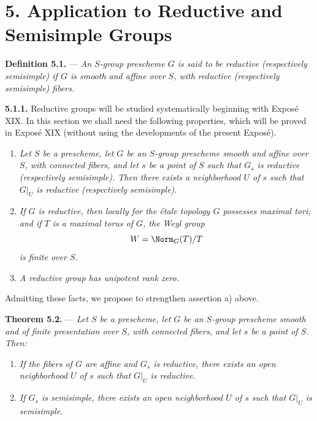 
%
\section*{5. Application to Reductive and Semisimple Groups}

\noindent{}%
\textbf{Definition 5.1.} --- \textit{An \(S\)-group prescheme
\(G\) is said to be \emph{reductive} (respectively
\emph{semisimple}) if \(G\) is smooth and affine over \(S\), with
reductive (respectively semisimple) fibers.}

\medskip
\noindent{}%
\textbf{5.1.1.}
Reductive groups will be studied systematically beginning with
Exposé XIX. In this section we shall need the following
properties, which will be proved in Exposé XIX (without using the
developments of the present Exposé).

\begin{enumerate}
\renewcommand{\labelenumi}{\textit{\alph{enumi})}}
\item \textit{Let \(S\) be a prescheme, let \(G\) be an
\(S\)-group prescheme smooth and affine over \(S\), with connected
fibers, and let \(s\) be a point of \(S\) such that \(G_s\) is
reductive (respectively semisimple). Then there exists a
neighborhood \(U\) of \(s\) such that \(G|_U\) is reductive
(respectively semisimple).}

\item \textit{If \(G\) is reductive, then locally for the étale
topology \(G\) possesses maximal tori; and if \(T\) is a maximal
torus of \(G\), the Weyl group}
\[
  W=\Norm_G(T)/T
\]
\textit{is finite over \(S\).}

\item \textit{A reductive group has unipotent rank zero.}
\end{enumerate}

Admitting these facts, we propose to strengthen assertion a)
above.

\medskip
\noindent{}%
\textbf{Theorem 5.2.} --- \textit{Let \(S\) be a prescheme, let
\(G\) be an \(S\)-group prescheme smooth and of finite
presentation over \(S\), with connected fibers, and let \(s\) be
a point of \(S\). Then:}

\begin{enumerate}
\renewcommand{\labelenumi}{\textit{(\roman{enumi})}}
\item \textit{If the fibers of \(G\) are affine and \(G_s\) is
reductive, there exists an open neighborhood \(U\) of \(s\) such
that \(G|_U\) is reductive.}

\item \textit{If \(G_s\) is semisimple, there exists an open
neighborhood \(U\) of \(s\) such that \(G|_U\) is semisimple.}
\end{enumerate}

